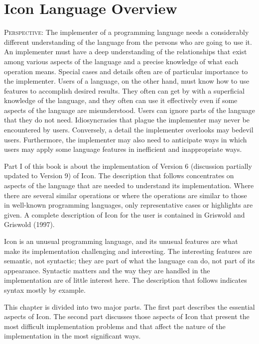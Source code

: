 \chapter{Icon Language Overview}

\textsc{Perspective}: The implementer of a programming language needs
a considerably different understanding of the language from the
persons who are going to use it. An implementer must have a deep
understanding of the relationships that exist among various aspects of
the language and a precise knowledge of what each operation
means. Special cases and details often are of particular importance to
the implementer. Users of a language, on the other hand, must know how
to use features to accomplish desired results. They often can get by
with a superficial knowledge of the language, and they often can use
it effectively even if some aspects of the language are
misunderstood. Users can ignore parts of the language that they do not
need. Idiosyncrasies that plague the implementer may never be
encountered by users.  Conversely, a detail the implementer overlooks
may bedevil users. Furthermore, the implementer may also need to
anticipate ways in which users may apply some language features in
inefficient and inappropriate ways.

Part I of this book is about the implementation of Version 6
(discussion partially updated to Version 9) of Icon. The description
that follows concentrates on aspects of the language that are needed
to understand its implementation. Where there are several similar
operations or where the operations are similar to those in well-known
programming languages, only representative cases or highlights are
given. A complete description of Icon for the user is contained in
Griswold and Griswold (1997).

Icon is an unusual programming language, and its unusual features are
what make its implementation challenging and interesting. The
interesting features are semantic, not syntactic; they are part of
what the language can do, not part of its appearance. Syntactic
matters and the way they are handled in the implementation are of
little interest here.  The description that follows indicates syntax
mostly by example.

This chapter is divided into two major parts. The first part describes
the essential aspects of Icon. The second part discusses those aspects
of Icon that present the most difficult implementation problems and
that affect the nature of the implementation in the most significant
ways.

